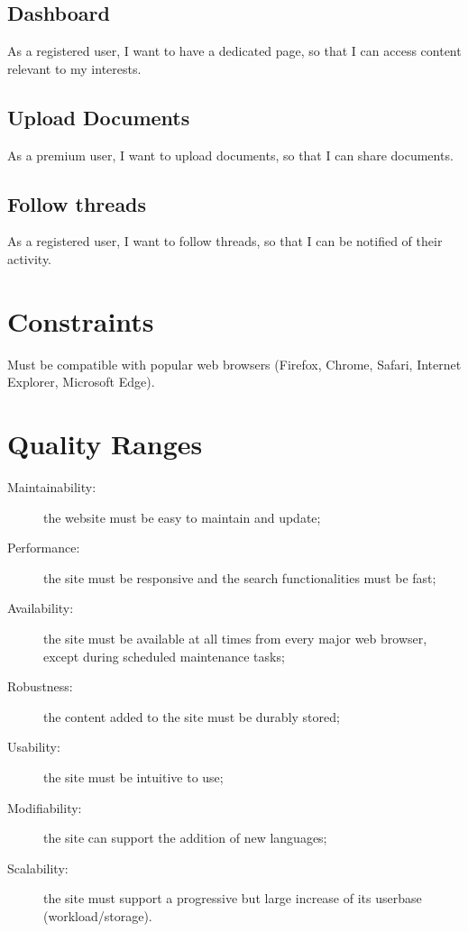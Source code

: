 \documentclass [a4paper, 11pt]{article}
\begin{document}
\subsection{Dashboard}
As a registered user, I want to have a dedicated page, so that I can access content relevant to my interests.

\subsection{Upload Documents}
As a premium user, I want to upload documents, so that I can share documents.

\subsection{Follow threads}
As a registered user, I want to follow threads, so that I can be notified of their activity.



\section{Constraints}
Must be compatible with popular web browsers (Firefox, Chrome, Safari, Internet Explorer, Microsoft Edge).



\section{Quality Ranges}
\begin{description}
	\item [Maintainability:] the website must be easy to maintain and update;
	\item [Performance:] the site must be responsive and the search functionalities must be fast;
	\item [Availability:] the site must be available at all times from every major web browser, except during scheduled maintenance tasks;
	\item [Robustness:] the content added to the site must be durably stored;
	\item [Usability:] the site must be intuitive to use;
	\item [Modifiability:] the site can support the addition of new languages;
	\item [Scalability:] the site must support a progressive but large increase of its userbase (workload/storage).
\end{description}
\end{document}
